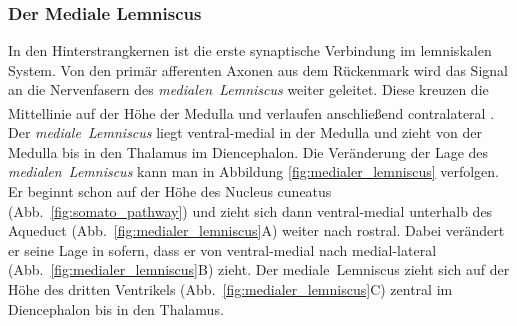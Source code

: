 \documentclass[12pt,a4paper,pdftex]{article}
\begin{document}
\subsubsection*{Der Mediale Lemniscus}
In den Hinterstrangkernen ist die erste synaptische Verbindung im lemniskalen System. Von den primär afferenten Axonen aus dem Rückenmark wird das Signal an die Nervenfasern des \textit{medialen~Lemniscus} weiter geleitet. Diese kreuzen die Mittellinie auf der Höhe der Medulla und verlaufen anschließend contralateral \textsuperscript{\cite[22]{kandel2013principles}}. 
Der \textit{mediale~Lemniscus} liegt ventral-medial in der Medulla und zieht von der Medulla bis in den Thalamus im Diencephalon. Die Veränderung der Lage des \textit{medialen~Lemniscus}  kann man in Abbildung \ref{fig:medialer_lemniscus} verfolgen. Er beginnt schon auf der Höhe des Nucleus cuneatus (Abb.~\ref{fig:somato_pathway}) und zieht sich dann ventral-medial unterhalb des Aqueduct (Abb.~\ref{fig:medialer_lemniscus}A) weiter nach rostral. Dabei verändert er seine Lage in sofern, dass er von ventral-medial nach medial-lateral (Abb.~\ref{fig:medialer_lemniscus}B) zieht. Der mediale~Lemniscus zieht sich auf der Höhe des dritten Ventrikels (Abb.~\ref{fig:medialer_lemniscus}C) zentral im Diencephalon bis in den Thalamus.
\end{document}

